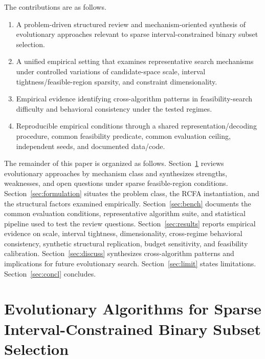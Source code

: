 \documentclass[lettersize,journal]{IEEEtran}
\begin{document}
The contributions are as follows.
\begin{enumerate}
\item A problem-driven structured review and mechanism-oriented synthesis of evolutionary approaches relevant to sparse interval-constrained binary subset selection.
\item A unified empirical setting that examines representative search mechanisms under controlled variations of candidate-space scale, interval tightness/feasible-region sparsity, and constraint dimensionality.
\item Empirical evidence identifying cross-algorithm patterns in feasibility-search difficulty and behavioral consistency under the tested regimes.
\item Reproducible empirical conditions through a shared representation/decoding procedure, common feasibility predicate, common evaluation ceiling, independent seeds, and documented data/code.
\end{enumerate}

The remainder of this paper is organized as follows.
Section~\ref{sec:related} reviews evolutionary approaches by mechanism class and synthesizes strengths, weaknesses, and open questions under sparse feasible-region conditions.
Section~\ref{sec:formulation} situates the problem class, the RCFA instantiation, and the structural factors examined empirically.
Section~\ref{sec:bench} documents the common evaluation conditions, representative algorithm suite, and statistical pipeline used to test the review questions.
Section~\ref{sec:results} reports empirical evidence on scale, interval tightness, dimensionality, cross-regime behavioral consistency, synthetic structural replication, budget sensitivity, and feasibility calibration.
Section~\ref{sec:discuss} synthesizes cross-algorithm patterns and implications for future evolutionary search.
Section~\ref{sec:limit} states limitations.
Section~\ref{sec:concl} concludes.

\section{Evolutionary Algorithms for Sparse Interval-Constrained Binary Subset Selection}
\label{sec:related}
\end{document}
